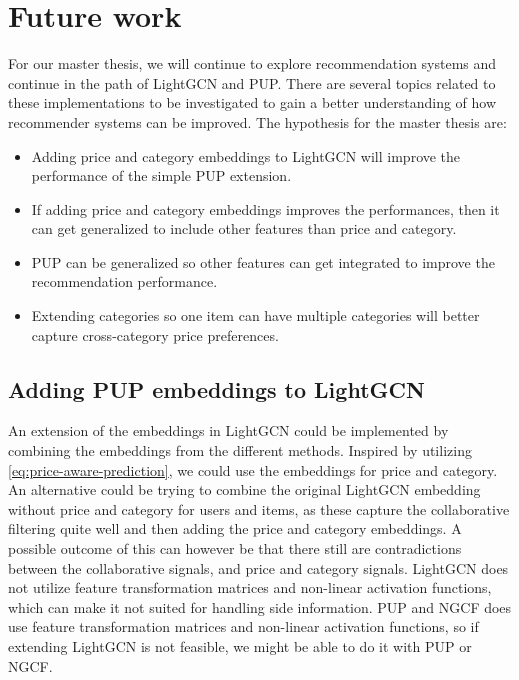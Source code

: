 \section{Future work}
For our master thesis, we will continue to explore recommendation systems and continue in the path of LightGCN and PUP.
There are several topics related to these implementations to be investigated to gain a better understanding of how recommender systems can be improved.
The hypothesis for the master thesis are:
\begin{itemize}
    \item Adding price and category embeddings to LightGCN will improve the performance of the simple PUP extension.
    \item If adding price and category embeddings improves the performances, then it can get generalized to include other features than price and category.
    \item PUP can be generalized so other features can get integrated to improve the recommendation performance.
    \item Extending categories so one item can have multiple categories will better capture cross-category price preferences.
\end{itemize}

\subsection{Adding PUP embeddings to LightGCN}
An extension of the embeddings in LightGCN could be implemented by combining the embeddings from the different methods.
Inspired by utilizing \autoref{eq:price-aware-prediction}, we could use the embeddings for price and category.
An alternative could be trying to combine the original LightGCN embedding without price and category for users and items, as these capture the collaborative filtering quite well and then adding the price and category embeddings.
A possible outcome of this can however be that there still are contradictions between the collaborative signals, and price and category signals.
LightGCN does not utilize feature transformation matrices and non-linear activation functions, which can make it not suited for handling side information.
PUP and NGCF does use feature transformation matrices and non-linear activation functions, so if extending LightGCN is not feasible, we might be able to do it with PUP or NGCF.

